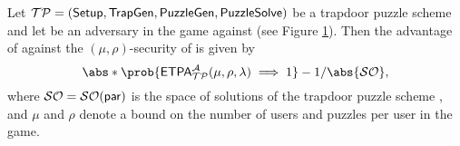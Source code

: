 \begin{definition}
  Let \(\TP = (\Setup,\allowbreak \TrapGen,\allowbreak \PuzzleGen,
  \linebreak[4] \PuzzleSolve)\) be a trapdoor puzzle scheme
  and let \advA{} be an adversary in the \ETPA{} game against \TP (see Figure \ref{fig:etpa}).
  Then the advantage of \advA{} against the \((\mu,\rho)\)-\ETPA security of \TP is given by
  \begin{equation}
    \abs*{\prob{\ETPA{}_{\TP}^{\advA}(\mu,\rho,\lambda) \implies 1} - 1/\abs{\SO}},
  \end{equation}
  where \(\mathcal{SO} = \mathcal{SO}{}(\mathsf{par})\) is the space of solutions of the trapdoor puzzle scheme \TP,
  and \(\mu\) and \(\rho\) denote a bound on the number of users and puzzles per user
  in the \ETPA game.
\end{definition}

\begin{figure}
  \begin{pcvstack}[center,space=0.5cm]
    \begin{pchstack}[space=1cm]
    \end{pchstack}
  \end{pcvstack}\caption{}\label{fig:etpa}
\end{figure}

